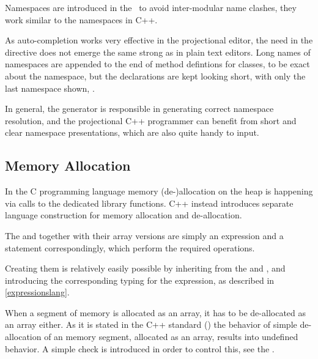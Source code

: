 Namespaces are introduced in the \pcpp\ to avoid inter-modular name clashes, they work similar to 
the namespaces in C++.

As auto-completion works very effective in the projectional editor, the need in the  directive does
not emerge the same strong as in plain text editors. Long names of namespaces are appended to the end of method
defintions for classes, to be exact about the namespace, but the declarations are kept looking short, with only 
the last namespace shown, .


In general, the generator is responsible in generating correct namespace 
resolution, and the projectional C++ programmer can benefit from short and clear namespace
presentations, which are also quite handy to input.


\subsection{Memory Allocation}

In the C programming language memory (de-)allocation on the heap is happening via calls to the dedicated library functions. 
C++ instead introduces separate language construction for memory allocation and de-allocation. 

The  and  together with their array versions are simply an expression and a statement correspondingly,
which perform the required operations.

Creating them is relatively easily possible by inheriting from the  and  ,
and introducing the corresponding typing for the  expression, as described in \ref{expressionslang}.

When a segment of memory is allocated as an array, it has to be de-allocated as an array either.
As it is stated in the C++ standard (\cite{cpp11}) the behavior of simple de-allocation of an 
memory segment, allocated as an array, results into undefined behavior. A simple check is introduced
in order to control this, see the . 







%
%




